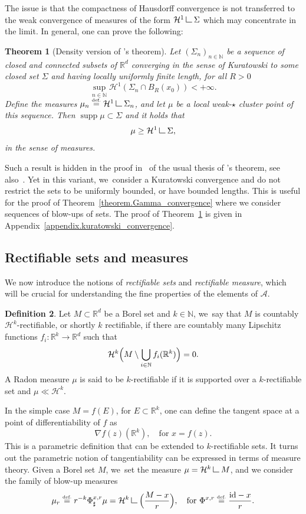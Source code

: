 \documentclass[JEP,XML,SOM,Unicode,NoFloatCountersInSection,published]{cedram}
\newtheorem{theorem}{Theorem}[section]
\theoremstyle{definition}
\newtheorem{definition}[theorem]{Definition}
\newcommand{\eqdef}{\ensuremath{\stackrel{\mbox{\upshape\tiny def.}}{=}}}
\newcommand\LM[1]{\hbox{\vrule width.5pt \vbox to#1pt{\vfill \hrule width#1pt height.5pt}}}
\newcommand\LL{{\mathchoice {\>\LM7\>}{\>\LM7\>}{\,\LM5\,}{\,\LM{3.35}\,}}}
\newcommand{\mres}{\LL}
\newcommand\cH{\mathcal{H}}
\newcommand{\RR}{\mathbb{R}}
\DeclareMathOperator{\supp}{supp}
\begin{document}
The issue is that the compactness of Hausdorff convergence is not transferred to the weak convergence of measures of the form $\cH^1\mres \Sigma$ which may concentrate in the limit.
In general, one can prove the following:
\begin{theorem}[Density version of \Golab's theorem]\label{theorem.Golab_localversion}
Let ${(\Sigma_n)}_{n \in \mathbb{N}}$ be a sequence of closed and connected subsets of $\RR^d$ converging in the sense of Kuratowski to some closed set $\Sigma$ and having locally uniformly finite length, \ie for all $R > 0$
\[
\sup_{n \in \mathbb{N}} \cH^1(\Sigma_n \cap B_R(x_0)) < +\infty.
\]
Define the measures $\mu_n \eqdef \cH^1\mres \Sigma_n$, and let $\mu$ be a local weak-$\star$ cluster point of this sequence. Then $\supp\mu \subset \Sigma$ and it holds that
\[
\mu \ge \cH^1\mres \Sigma,
\]
in the sense of measures.
\end{theorem}
Such a result is hidden in the proof in~\cite{ambrosio2004topics} of the usual thesis of \Golab's theorem, see also~\cite{paolini2013existence}. Yet in this variant, we~consider a Kuratowski convergence and do not restrict the sets to be uniformly bounded, or have bounded lengths.
This is useful for the proof of Theorem~\ref{theorem.Gamma_convergence} where we consider sequences of blow-ups of sets. The proof of Theorem~\ref{theorem.Golab_localversion} is given in Appendix~\ref{appendix.kuratowski_convergence}.

\subsection{Rectifiable sets and measures}
We now introduce
the notions of \emph{rectifiable sets} and \emph{rectifiable measure}, which will be crucial for understanding the fine
properties of the elements of $\mathcal{A}$.
\begin{definition}
Let $M \subset \RR^d$ be a Borel set and $k \in \mathbb{N}$, we~say that $M$ is countably $\cH^k$-rectifiable, or shortly $k$ rectifiable, if there are countably many Lipschitz functions $f_i: \RR^k \to \RR^d$ such that
\[
\cH^k\Bigl(
M \setminus \bigcup_{i \in \mathbb{N}} f_i(\RR^k)
\Bigr)
= 0.
\]
A Radon measure $\mu$ is said to be $k$-rectifiable if it is supported over a $k$-rectifiable set and $\mu \ll \cH^k$.
\end{definition}

In the simple case $M = f(E)$, for $E \subset \RR^k$, one can define the tangent space at a point of differentiability of $f$ as
\[
\nabla f(z)(\RR^k), \quad\text{for $x = f(z)$}.
\]
This is a parametric definition that can be extended to $k$-rectifiable sets. It turns out the parametric notion of tangentiability can be expressed in terms of measure theory. Given a Borel set $M$, we~set the measure $\mu = \cH^k\mres M$, and we consider the family of blow-up measures
\begin{equation}\label{blowup_measure_operator}
\mu_r \eqdef r^{-k} \Phi^{x,r}_\sharp \mu = \cH^k\mres \Bigl(\frac{M - x}{r}\Bigr), \quad\text{for }
\Phi^{x,r}\eqdef \frac{\text{id} - x}{r}.
\end{equation}
\end{document}
